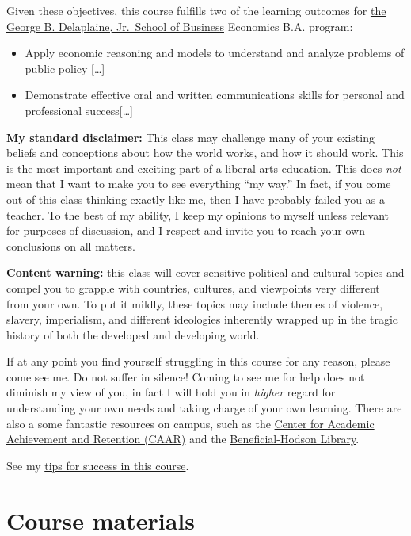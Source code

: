 \documentclass{article}
\providecommand{\tightlist}{%
  \setlength{\itemsep}{0pt}\setlength{\parskip}{0pt}}
\begin{document}
Given these objectives, this course fulfills two of the learning
outcomes for
\href{https://www.hood.edu/academics/departments/george-b-delaplaine-jr-school-business/student-learning-outcomes}{the
George B. Delaplaine, Jr.~School of Business} Economics B.A. program:

\begin{itemize}
\tightlist
\item
  Apply economic reasoning and models to understand and analyze problems
  of public policy {[}\ldots{]}
\item
  Demonstrate effective oral and written communications skills for
  personal and professional success{[}\ldots{]}
\end{itemize}

\textbf{My standard disclaimer:} This class may challenge many of your
existing beliefs and conceptions about how the world works, and how it
should work. This is the most important and exciting part of a liberal
arts education. This does \emph{not} mean that I want to make you to see
everything ``my way.'' In fact, if you come out of this class thinking
exactly like me, then I have probably failed you as a teacher. To the
best of my ability, I keep my opinions to myself unless relevant for
purposes of discussion, and I respect and invite you to reach your own
conclusions on all matters.

\textbf{Content warning:} this class will cover sensitive political and
cultural topics and compel you to grapple with countries, cultures, and
viewpoints very different from your own. To put it mildly, these topics
may include themes of violence, slavery, imperialism, and different
ideologies inherently wrapped up in the tragic history of both the
developed and developing world.

If at any point you find yourself struggling in this course for any
reason, please come see me. Do not suffer in silence! Coming to see me
for help does not diminish my view of you, in fact I will hold you in
\emph{higher} regard for understanding your own needs and taking charge
of your own learning. There are also a some fantastic resources on
campus, such as the
\href{http://www.hood.edu/campus-services/academic-services/index.html}{Center
for Academic Achievement and Retention (CAAR)} and the
\href{http://www.hood.edu/library/}{Beneficial-Hodson Library}.

See my \href{http://devf19.classes.ryansafner.com/reference\#tips}{tips
for success in this course}.

\hypertarget{course-materials}{%
\section{Course materials}\label{course-materials}}
\end{document}
